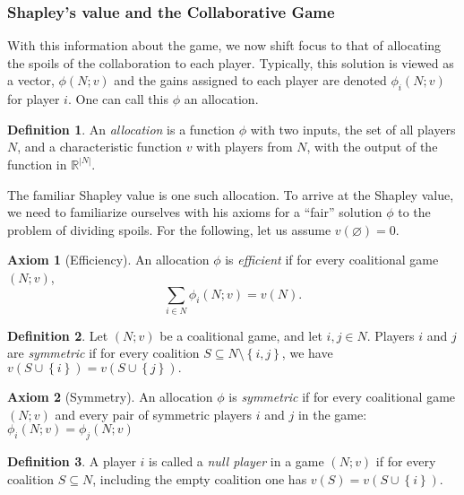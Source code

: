 \documentclass[12pt,letterpaper,final]{article}
\theoremstyle{plain}
\theoremstyle{plain}
\theoremstyle{plain}
\theoremstyle{plain}
\theoremstyle{plain}
\theoremstyle{plain}
\theoremstyle{plain}
\theoremstyle{definition}
\newtheorem{definition}{Definition}[section]
\theoremstyle{definition}
\theoremstyle{definition}
\theoremstyle{definition}
\theoremstyle{definition}
\newtheorem{axiom}{Axiom}[section]
\theoremstyle{remark}
\theoremstyle{remark}
\theoremstyle{remark}
\theoremstyle{remark}
\begin{document}
\subsubsection{Shapley's value and the Collaborative Game}

With this information about the game, we now shift focus to that of
allocating the spoils of the collaboration to each player. Typically,
this solution is viewed as a vector, \(\phi(N;v)\) and the gains
assigned 
to each player are denoted \(\phi_i(N;v)\) for player \(i\). One can
call 
this \(\phi\) an allocation.

\begin{definition}
  An \emph{allocation} is a function \(\phi\) with two inputs, the set of all
  players \(N\), and a characteristic function \(v\) with players from
  \(N\), with the output of the function in \(\mathbb{R}^{|N|}\).
\end{definition}

The familiar
Shapley value is one such allocation. To arrive at the Shapley value,
we need 
to familiarize ourselves with his axioms for a ``fair'' solution
\(\phi\) to the problem of dividing spoils. For the following, let us assume \(v(\varnothing) = 0\).

\begin{axiom}[Efficiency]\label{ax:eff}
  An allocation \(\phi\) is \emph{efficient} if for every
  coalitional game \((N;v)\), 
  \[\sum_{i \in N} \phi_i(N;v) = v(N).\] 
\end{axiom}


\begin{definition}
  Let \((N;v)\) be a coalitional game, and let \(i, j \in N\). Players
  \(i\) 
  and \(j\) are \emph{symmetric} if for every coalition 
  \(S \subseteq N \setminus \left\{i,j\right\} \), we have 
  \(v\left(S\cup \left\{i\right\}\right) = v\left(S \cup \left\{j\right\}\right).\)
\end{definition}

\begin{axiom}[Symmetry]\label{ax:sym}
  An allocation \(\phi\) is \emph{symmetric} if for every coalitional
  game \((N;v)\) and every pair of symmetric players \(i\) and \(j\)
  in the game: 
  \(\phi_i(N;v) = \phi_j(N;v)\)
\end{axiom}


\begin{definition}
  A player \(i\) is called a \emph{null player} in a game \((N;v)\) if for
  every coalition \(S \subseteq N\), including the empty coalition
  one has 
  \(v(S) = v(S\cup \left\{i\right\}) \).
\end{definition}
\end{document}
